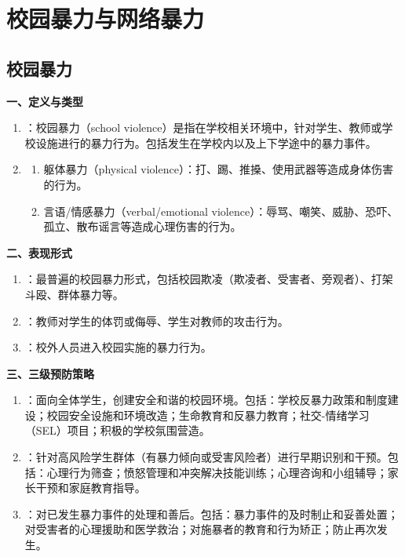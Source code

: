 \section{校园暴力与网络暴力}

\subsection{校园暴力}

\begin{keybox}
\textbf{一、定义与类型}
\begin{enumerate}[leftmargin=*]
    \item {}：校园暴力（school violence）是指在学校相关环境中，针对学生、教师或学校设施进行的暴力行为。包括发生在学校内以及上下学途中的暴力事件。
    \item {}
    \begin{enumerate}
        \item 躯体暴力（physical violence）：打、踢、推搡、使用武器等造成身体伤害的行为。
        \item 言语/情感暴力（verbal/emotional violence）：辱骂、嘲笑、威胁、恐吓、孤立、散布谣言等造成心理伤害的行为。
    \end{enumerate}
\end{enumerate}

\textbf{二、表现形式}
\begin{enumerate}[leftmargin=*]
    \item {}：最普遍的校园暴力形式，包括校园欺凌（欺凌者、受害者、旁观者）、打架斗殴、群体暴力等。
    \item {}：教师对学生的体罚或侮辱、学生对教师的攻击行为。
    \item {}：校外人员进入校园实施的暴力行为。
\end{enumerate}

\textbf{三、三级预防策略}
\begin{enumerate}[leftmargin=*]
    \item {}：面向全体学生，创建安全和谐的校园环境。包括：学校反暴力政策和制度建设；校园安全设施和环境改造；生命教育和反暴力教育；社交-情绪学习（SEL）项目；积极的学校氛围营造。
    \item {}：针对高风险学生群体（有暴力倾向或受害风险者）进行早期识别和干预。包括：心理行为筛查；愤怒管理和冲突解决技能训练；心理咨询和小组辅导；家长干预和家庭教育指导。
    \item {}：对已发生暴力事件的处理和善后。包括：暴力事件的及时制止和妥善处置；对受害者的心理援助和医学救治；对施暴者的教育和行为矫正；防止再次发生。
\end{enumerate}
\end{keybox}

